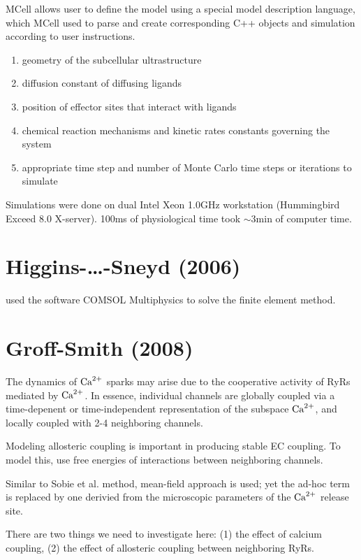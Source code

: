 MCell allows user to define the model using a special model description
language, which MCell used to parse and create corresponding C++ objects and
simulation according to user instructions.
\begin{enumerate}
  \item geometry of the subcellular ultrastructure
  \item diffusion constant of diffusing ligands
  \item position of effector sites that interact with ligands
  \item chemical reaction mechanisms and kinetic rates constants governing the
  system
  \item appropriate time step and number of Monte Carlo time steps or iterations
  to simulate
\end{enumerate}

Simulations were done on dual Intel Xeon 1.0GHz workstation (Hummingbird Exceed
8.0 X-server). 100ms of physiological time took $\sim 3$min of computer time. 

\section{Higgins-\ldots-Sneyd (2006)}

\citep{higgins2007} used the software COMSOL Multiphysics to solve the finite
element method.

\section{Groff-Smith (2008)}
\label{sec:groff_smith_2008}

The dynamics of ${\text{Ca}^{2+}}$ sparks may arise due to the cooperative activity of RyRs
mediated by ${\text{Ca}^{2+}}$. In essence, individual channels are globally coupled via a
time-depenent or time-independent representation of the subspace ${\text{Ca}^{2+}}$, and
locally coupled with 2-4 neighboring channels. 

Modeling allosteric coupling is important in producing stable EC coupling. To
model this, \citep{stern1999lcm} use free energies of interactions between
neighboring channels. 

Similar to Sobie et al. method, mean-field approach is used; yet the ad-hoc term
is replaced by one derivied from the microscopic parameters of the ${\text{Ca}^{2+}}$ release
site. 

There are two things we need to investigate here: (1) the effect of
calcium coupling, (2) the effect of allosteric coupling between
neighboring RyRs. 

